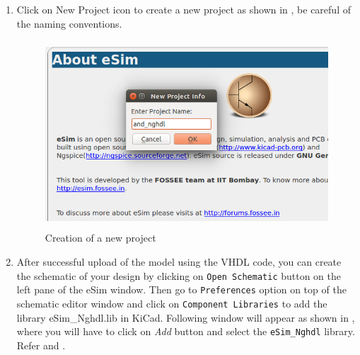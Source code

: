 \begin{enumerate}
\item Click on New Project icon to create a new project as shown in , be careful of the naming conventions.

\begin{figure}[!htp]
\centering
\includegraphics[width = 13cm, height = 7cm]{./NGHDL/screen1.png}
\caption{Creation of a new project}
\label{screen1}
\end{figure}

\item After successful upload of the model using the VHDL code, you can create the schematic of your design by clicking on \texttt{Open Schematic} button on the left pane of the eSim window. Then go to \texttt{Preferences} option on top of the schematic editor window and click on \texttt{Component Libraries} to add the library eSim\_Nghdl.lib in KiCad. Following window will appear as shown in , where you will have to click on \textit {Add} button and select the \texttt{eSim\_Nghdl} library. Refer  and . %
    

\end{enumerate}
